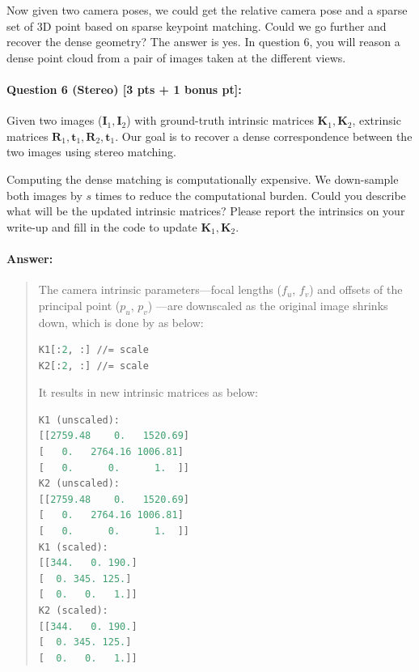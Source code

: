 \documentclass[11pt]{article}
\begin{document}
Now given two camera poses, we could get the relative camera pose and a sparse set of 3D point based on sparse keypoint matching. Could we go further and recover the dense geometry? The answer is yes. In question 6, you will reason a dense point cloud from a pair of images taken at the different views. 


\paragraph{Question 6 (Stereo) [3 pts + 1 bonus pt]:}
Given two images ($\mathbf{I}_1, \mathbf{I}_2$) with ground-truth intrinsic matrices $\mathbf{K}_1, \mathbf{K}_2$, extrinsic matrices $\mathbf{R}_1, \mathbf{t}_1, \mathbf{R}_2, \mathbf{t}_1$. Our goal is to recover a dense correspondence between the two images using stereo matching. 

Computing the dense matching is computationally expensive. We down-sample both images by $s$ times to reduce the computational burden. Could you describe what will be the updated intrinsic matrices? Please report the intrinsics on your write-up and fill in the code to update $\mathbf{K}_1, \mathbf{K}_2$. 

\paragraph{Answer:} 
\begin{quote}

The camera intrinsic parameters---focal lengths ($f_u$, $f_v$) and offsets of the principal point ($p_u$, $p_v$) ---are downscaled as the original image shrinks down, which is done by as below:

\begin{lstlisting}[language=Python, basicstyle=\scriptsize]
K1[:2, :] //= scale
K2[:2, :] //= scale
\end{lstlisting}

It results in new intrinsic matrices as below:

\begin{lstlisting}[language=Python, basicstyle=\scriptsize]
K1 (unscaled): 
[[2759.48    0.   1520.69]
[   0.   2764.16 1006.81]
[   0.      0.      1.  ]]
K2 (unscaled): 
[[2759.48    0.   1520.69]
[   0.   2764.16 1006.81]
[   0.      0.      1.  ]]
K1 (scaled): 
[[344.   0. 190.]
[  0. 345. 125.]
[  0.   0.   1.]]
K2 (scaled): 
[[344.   0. 190.]
[  0. 345. 125.]
[  0.   0.   1.]]
\end{lstlisting}
    
\end{quote}
\end{document}
